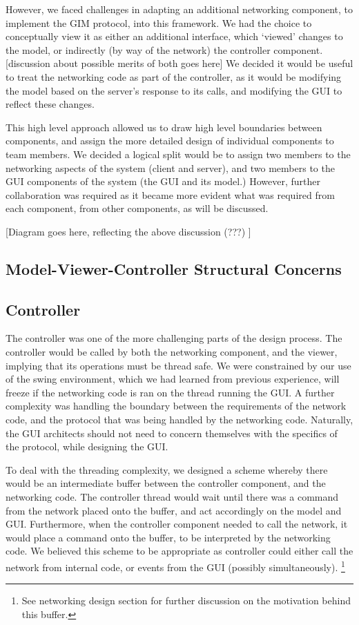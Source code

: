 However, we faced challenges in adapting an additional networking component, to implement the GIM protocol, into this framework. We had the choice to conceptually view it as either an additional interface, which ‘viewed’ changes to the model, or indirectly (by way of the network) the controller component. [discussion about possible merits of both goes here] We decided it would be useful to treat the networking code as part of the controller, as it would be modifying the model based on the server’s response to its calls, and modifying the GUI to reflect these changes.
	
This high level approach allowed us to draw high level boundaries between components, and assign the more detailed design of individual components to team members. We decided a logical split would be to assign two members to the networking aspects of the system (client and server), and two members to the GUI components of the system (the GUI and its model.) However, further collaboration was required as it became more evident what was required from each component, from other components, as will be discussed. 

[Diagram goes here, reflecting the above discussion (???) ]

\subsection {Model-Viewer-Controller Structural Concerns}

\subsection {Controller}

The controller was one of the more challenging parts of the design process. The controller would be called by both the networking component, and the viewer, implying that its operations must be thread safe. We were constrained by our use of the swing environment, which we had learned from previous experience, will freeze if the networking code is ran on the thread running the GUI. A further complexity was handling the boundary between the requirements of the network code, and the protocol that was being handled by the networking code. Naturally, the GUI architects should not need to concern themselves with the specifics of the protocol, while designing the GUI. 

To deal with the threading complexity, we designed a scheme whereby there would be an intermediate buffer between the controller component, and the networking code. The controller thread would wait until there was a command from the network placed onto the buffer, and act accordingly on the model and GUI. Furthermore, when the controller component needed to call the network, it would place a command onto the buffer, to be interpreted by the  networking code. We believed this scheme to be appropriate as controller could either call the network from internal code, or events from the GUI (possibly simultaneously). \footnote{See networking design section for further discussion on the motivation behind this buffer.}

